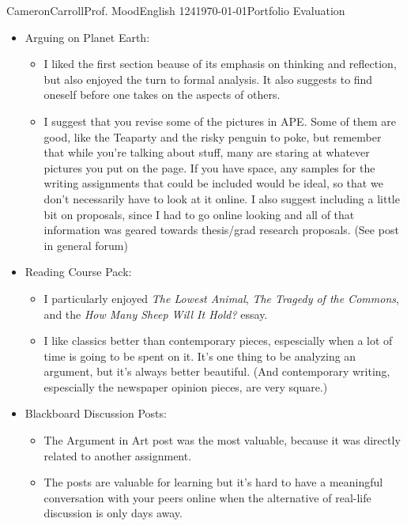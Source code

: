 \documentclass[12pt,letterpaper]{article}
\begin{document}
\begin{mla}{Cameron}{Carroll}{Prof. Mood}{English 124}{\today}{Portfolio Evaluation}

\begin{itemize}
\item Arguing on Planet Earth: 
	\begin{itemize}
	\item I liked the first section beause of its emphasis on thinking and reflection, but also enjoyed the turn to formal analysis. It also suggests to find oneself before one takes on the aspects of others.
	\item I suggest that you revise some of the pictures in APE. Some of them are good, like the Teaparty and the risky penguin to poke, but remember that while you're talking about stuff, many are staring at whatever pictures you put on the page. If you have space, any samples for the writing assignments that could be included would be ideal, so that we don't necessarily have to look at it online. I also suggest including a little bit on proposals, since I had to go online looking and all of that information was geared towards thesis/grad research proposals. (See post in general forum)
	\end{itemize}

\item Reading Course Pack: 
	\begin{itemize}
	\item I particularly enjoyed \emph{The Lowest Animal}, \emph{The Tragedy of the Commons}, and the \emph{How Many Sheep Will It Hold?} essay.
	\item I like classics better than contemporary pieces, espescially when a lot of time is going to be spent on it. It's one thing to be analyzing an argument, but it's always better beautiful. (And contemporary writing, espescially the newspaper opinion pieces, are very square.) 
	\end{itemize}

\item Blackboard Discussion Posts: 
	\begin{itemize}
	\item The Argument in Art post was the most valuable, because it was directly related to another assignment.
	\item The posts are valuable for learning but it's hard to have a meaningful conversation with your peers online when the alternative of real-life discussion is only days away. 
	\end{itemize}


\end{itemize}
\end{mla}
\end{document}
